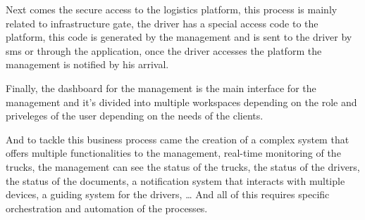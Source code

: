 Next comes the secure access to the logistics platform, this process is mainly related to infrastructure gate,
the driver has a special access code to the platform, this code is generated by the management and is sent to
the driver by sms or through the application, once the driver accesses the platform the management is notified
by his arrival.

Finally, the dashboard for the management is the main interface for the management and it's divided into multiple
workspaces depending on the role and priveleges of the user depending on the needs of the clients.

And to tackle this business process came the creation of a complex system that offers 
multiple functionalities to the management, real-time monitoring of the trucks,
the management can see the status of the trucks, the status of the drivers,
the status of the documents, a notification system that interacts with multiple devices,
a guiding system for the drivers, \dots
And all of this requires specific orchestration and automation of the processes.

